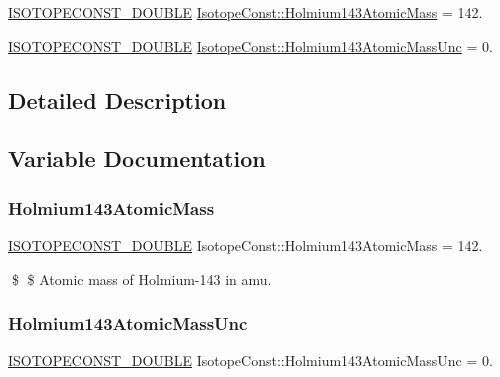 \begin{DoxyCompactItemize}
\item 
\mbox{\hyperlink{group___isotope_const-_macros_ga8f45a7272ce02c0b4c65c44636ed719a}{I\+S\+O\+T\+O\+P\+E\+C\+O\+N\+S\+T\+\_\+\+D\+O\+U\+B\+LE}} \mbox{\hyperlink{group___isotope_const-_holmium-_ho143_ga91d51fc0738cd3bc4cd7a5026426cb2f}{Isotope\+Const\+::\+Holmium143\+Atomic\+Mass}} = 142.
\item 
\mbox{\hyperlink{group___isotope_const-_macros_ga8f45a7272ce02c0b4c65c44636ed719a}{I\+S\+O\+T\+O\+P\+E\+C\+O\+N\+S\+T\+\_\+\+D\+O\+U\+B\+LE}} \mbox{\hyperlink{group___isotope_const-_holmium-_ho143_ga6d0071f8bbc2cf7c348d761fb8e091cb}{Isotope\+Const\+::\+Holmium143\+Atomic\+Mass\+Unc}} = 0.
\end{DoxyCompactItemize}


\subsection{Detailed Description}


\subsection{Variable Documentation}
\mbox{\label{group___isotope_const-_holmium-_ho143_ga91d51fc0738cd3bc4cd7a5026426cb2f}} 
\subsubsection{\texorpdfstring{Holmium143\+Atomic\+Mass}{Holmium143AtomicMass}}
{\footnotesize\ttfamily \mbox{\hyperlink{group___isotope_const-_macros_ga8f45a7272ce02c0b4c65c44636ed719a}{I\+S\+O\+T\+O\+P\+E\+C\+O\+N\+S\+T\+\_\+\+D\+O\+U\+B\+LE}} Isotope\+Const\+::\+Holmium143\+Atomic\+Mass = 142.}

\$ \$ Atomic mass of Holmium-\/143 in amu. \mbox{\label{group___isotope_const-_holmium-_ho143_ga6d0071f8bbc2cf7c348d761fb8e091cb}} 
\subsubsection{\texorpdfstring{Holmium143\+Atomic\+Mass\+Unc}{Holmium143AtomicMassUnc}}
{\footnotesize\ttfamily \mbox{\hyperlink{group___isotope_const-_macros_ga8f45a7272ce02c0b4c65c44636ed719a}{I\+S\+O\+T\+O\+P\+E\+C\+O\+N\+S\+T\+\_\+\+D\+O\+U\+B\+LE}} Isotope\+Const\+::\+Holmium143\+Atomic\+Mass\+Unc = 0.}

